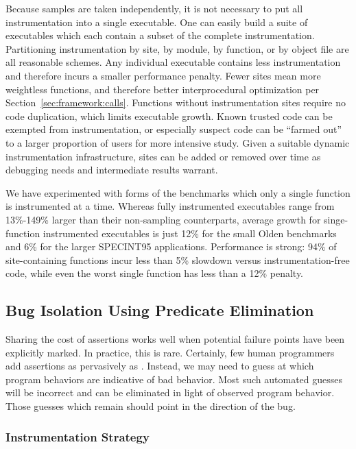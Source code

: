 Because samples are taken independently, it is not necessary to put
all instrumentation into a single executable.  One can easily build a
suite of executables which each contain a subset of the complete
instrumentation.  Partitioning instrumentation by site, by module, by
function, or by object file are all reasonable schemes.  Any
individual executable contains less instrumentation and therefore
incurs a smaller performance penalty.  Fewer sites mean more
weightless functions, and therefore better interprocedural
optimization per Section~\ref{sec:framework:calls}.  Functions without
instrumentation sites require no code duplication, which limits
executable growth.  Known trusted code can be exempted from
instrumentation, or especially suspect code can be ``farmed out'' to a
larger proportion of users for more intensive study.  Given a suitable
dynamic instrumentation infrastructure, sites can be added or removed
over time as debugging needs and intermediate results warrant.

We have experimented with forms of the \CCured benchmarks which only a
single function is instrumented at a time.  Whereas fully instrumented
executables range from 13\%-149\% larger than their non-sampling
counterparts, average growth for singe-function instrumented
executables is just 12\% for the small Olden benchmarks and 6\% for
the larger SPECINT95 applications.  Performance is strong: 94\% of
site-containing functions incur less than 5\% slowdown versus
instrumentation-free code, while even the worst single function has
less than a 12\% penalty.

\subsection{Bug Isolation Using Predicate Elimination}
\label{sec:ccrypt}

Sharing the cost of assertions works well when potential failure
points have been explicitly marked.  In practice, this is rare.
Certainly, few human programmers add assertions as pervasively as
\CCured.  Instead, we may need to guess at which program behaviors are
indicative of bad behavior.  Most such automated guesses will be
incorrect and can be eliminated in light of observed program behavior.
Those guesses which remain should point in the direction of the bug.

\subsubsection{Instrumentation Strategy}

